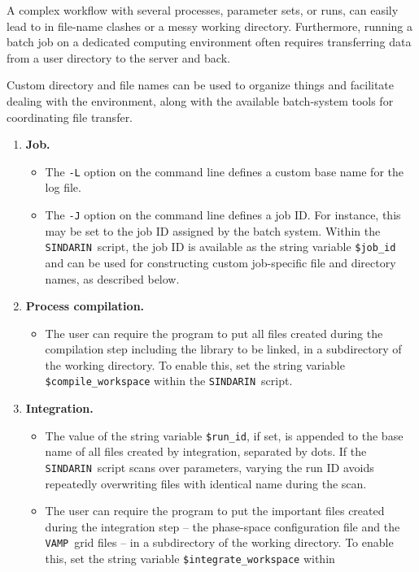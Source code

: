 \documentclass[12pt]{book}
\newcommand{\ttt}[1]{\texttt{#1}}
\newcommand{\vamp}{\ttt{VAMP}}
\newcommand{\sindarin}{\ttt{SINDARIN}}
\begin{document}
A complex workflow with several processes, parameter sets, or runs, can easily
lead to in file-name clashes or a messy working directory.  Furthermore,
running a batch job on a dedicated computing environment often requires
transferring data from a user directory to the server and back.

Custom directory and file names can be used to organize things and facilitate
dealing with the environment, along with the available batch-system tools for
coordinating file transfer.
\begin{enumerate}
\item
  \textbf{Job.}
  \begin{itemize}
  \item
    The \ttt{-L} option on the command line defines a custom base name for
    the log file.
  \item
    The \ttt{-J} option on the command line defines a job ID.  For instance,
    this may be set to the job ID assigned by the batch system.  Within the
    \sindarin\ script, the job ID is available as the string variable
    \ttt{\$job\_id} and can be used for constructing custom job-specific file
    and directory names, as described below.
  \end{itemize}
\item
  \textbf{Process compilation.}
  \begin{itemize}
  \item
    The user can require the program to put all files created during the
    compilation step including the library to be linked, in a subdirectory of
    the working directory.  To enable this, set the string variable
    \ttt{\$compile\_workspace} within the \sindarin\ script.
  \end{itemize}
\item
  \textbf{Integration.}
  \begin{itemize}
  \item
    The value of the string variable \ttt{\$run\_id}, if set, is appended to
    the base name of all files created by integration, separated by dots.  If
    the \sindarin\ script scans over parameters, varying the run ID avoids
    repeatedly overwriting files with identical name during the scan.
  \item
    The user can require the program to put the important files created during
    the integration step -- the phase-space configuration file and the
    \vamp\ grid files -- in a subdirectory of the working directory.  To
    enable this, set the string variable \ttt{\$integrate\_workspace} within

\end{itemize}
\end{enumerate}
\end{document}
